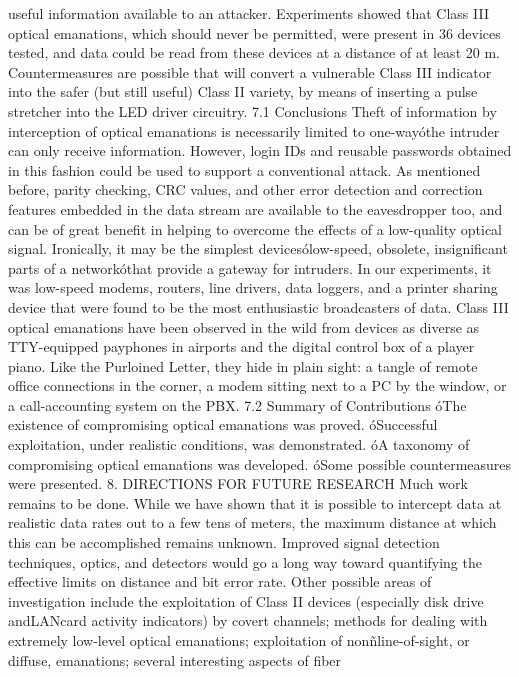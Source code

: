useful information available to an attacker. Experiments showed that Class III 
optical emanations, which should never be permitted, were present in 36%
devices tested, and data could be read from these devices at a distance of at least 
20 m. Countermeasures are possible that will convert a vulnerable Class III 
indicator into the safer (but still useful) Class II variety, by means of inserting 
a pulse stretcher into the LED driver circuitry. 
7.1 Conclusions 
Theft of information by interception of optical emanations is necessarily limited 
to one-wayóthe intruder can only receive information. However, login IDs 
and reusable passwords obtained in this fashion could be used to support a conventional 
attack. As mentioned before, parity checking, CRC values, and other 
error detection and correction features embedded in the data stream are available 
to the eavesdropper too, and can be of great benefit in helping to overcome 
the effects of a low-quality optical signal. 
Ironically, it may be the simplest devicesólow-speed, obsolete, insignificant 
parts of a networkóthat provide a gateway for intruders. In our experiments, 
it was low-speed modems, routers, line drivers, data loggers, and a printer 
sharing device that were found to be the most enthusiastic broadcasters of 
data. Class III optical emanations have been observed in the wild from devices 
as diverse as TTY-equipped payphones in airports and the digital control box 
of a player piano. Like the Purloined Letter, they hide in plain sight: a tangle 
of remote office connections in the corner, a modem sitting next to a PC by the 
window, or a call-accounting system on the PBX. 
7.2 Summary of Contributions 
óThe existence of compromising optical emanations was proved. 
óSuccessful exploitation, under realistic conditions, was demonstrated. 
óA taxonomy of compromising optical emanations was developed. 
óSome possible countermeasures were presented. 
8. DIRECTIONS FOR FUTURE RESEARCH 
Much work remains to be done. While we have shown that it is possible to 
intercept data at realistic data rates out to a few tens of meters, the maximum 
distance at which this can be accomplished remains unknown. Improved 
signal detection techniques, optics, and detectors would go a long way toward 
quantifying the effective limits on distance and bit error rate. 
Other possible areas of investigation include the exploitation of Class II devices 
(especially disk drive andLANcard activity indicators) by covert channels; 
methods for dealing with extremely low-level optical emanations; exploitation 
of nonñline-of-sight, or diffuse, emanations; several interesting aspects of fiber 
